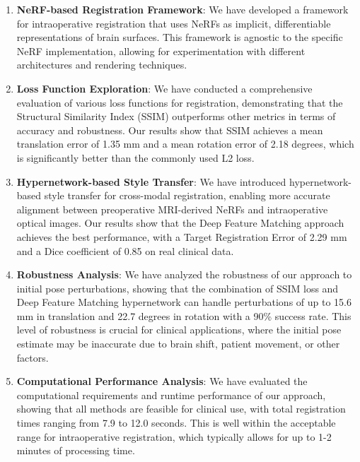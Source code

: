 \begin{enumerate}
    \item \textbf{NeRF-based Registration Framework}: We have developed a framework for intraoperative registration that uses NeRFs as implicit, differentiable representations of brain surfaces. This framework is agnostic to the specific NeRF implementation, allowing for experimentation with different architectures and rendering techniques.
    
    \item \textbf{Loss Function Exploration}: We have conducted a comprehensive evaluation of various loss functions for registration, demonstrating that the Structural Similarity Index (SSIM) outperforms other metrics in terms of accuracy and robustness. Our results show that SSIM achieves a mean translation error of 1.35 mm and a mean rotation error of 2.18 degrees, which is significantly better than the commonly used L2 loss.
    
    \item \textbf{Hypernetwork-based Style Transfer}: We have introduced hypernetwork-based style transfer for cross-modal registration, enabling more accurate alignment between preoperative MRI-derived NeRFs and intraoperative optical images. Our results show that the Deep Feature Matching approach achieves the best performance, with a Target Registration Error of 2.29 mm and a Dice coefficient of 0.85 on real clinical data.
    
    \item \textbf{Robustness Analysis}: We have analyzed the robustness of our approach to initial pose perturbations, showing that the combination of SSIM loss and Deep Feature Matching hypernetwork can handle perturbations of up to 15.6 mm in translation and 22.7 degrees in rotation with a 90\% success rate. This level of robustness is crucial for clinical applications, where the initial pose estimate may be inaccurate due to brain shift, patient movement, or other factors.
    
    \item \textbf{Computational Performance Analysis}: We have evaluated the computational requirements and runtime performance of our approach, showing that all methods are feasible for clinical use, with total registration times ranging from 7.9 to 12.0 seconds. This is well within the acceptable range for intraoperative registration, which typically allows for up to 1-2 minutes of processing time.
\end{enumerate}

